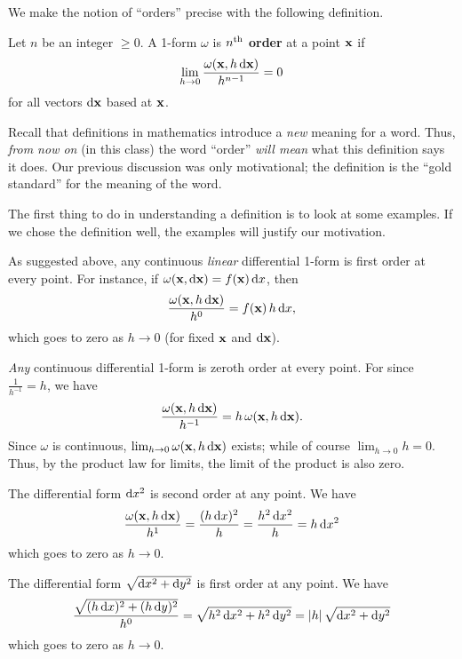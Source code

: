 \documentclass[12pt]{amsart}
\begin{document}
We make the notion of ``orders'' precise with the following definition.

\begin{defn}
  Let $n$ be an integer $\ge 0$.
  A 1-form $\omega$ is \textbf{$n^{\mathrm{th}}$ order} at a point $\mathbf{x}$ if
  \[ \lim_{h\to 0} \frac{\omega(\mathbf{x},h\,\mathrm{d}\mathbf{x})}{h^{n-1}} = 0 \]
  for all vectors $\mathrm{d} \mathbf{x}$ based at $\mathbf{x}$.
\end{defn}

Recall that definitions in mathematics introduce a \emph{new} meaning for a word.
Thus, \emph{from now on} (in this class) the word ``order'' \emph{will mean} what this definition says it does.
Our previous discussion was only motivational; the definition is the ``gold standard'' for the meaning of the word.

The first thing to do in understanding a definition is to look at some examples.
If we chose the definition well, the examples will justify our motivation.

\begin{eg}
  As suggested above, any continuous \emph{linear} differential 1-form is first order at every point.
  For instance, if $\omega(\mathbf{x},\mathrm{d}\mathbf{x}) = f(\mathbf{x}) \, \mathrm{d} x$, then
  \[ \frac{\omega(\mathbf{x},h\,\mathrm{d}\mathbf{x})}{h^0} = f(\mathbf{x}) \, h\, \mathrm{d} x,\]
  which goes to zero as $h\to 0$ (for fixed $\mathbf{x}$ and $\mathrm{d}\mathbf{x}$).
\end{eg}

\begin{eg}
  \emph{Any} continuous differential 1-form is zeroth order at every point.
  For since $\frac{1}{h^{-1}} = h$, we have
  \[\frac{\omega(\mathbf{x},h\,\mathrm{d} \mathbf{x})}{h^{-1}} = h \,\omega(\mathbf{x},h\,\mathrm{d} \mathbf{x}).\]
  Since $\omega$ is continuous, $\lim_{h\to 0} \omega(\mathbf{x},h\,\mathrm{d} \mathbf{x})$ exists; while of course $\lim_{h\to 0} h = 0$.
  Thus, by the product law for limits, the limit of the product is also zero.
\end{eg}

\begin{eg}
  The differential form $\mathrm{d} x^2$ is second order at any point.
  We have
  \[ \frac{\omega(\mathbf{x},h\,\mathrm{d}\mathbf{x})}{h^1} = \frac{(h\,\mathrm{d} x)^2}{h} = \frac{h^2 \, \mathrm{d} x^2}{h} = h \,\mathrm{d} x^2 \]
  which goes to zero as $h\to 0$.
\end{eg}

\begin{eg}
  The differential form $\sqrt{\mathrm{d} x^2+\mathrm{d} y^2}$ is first order at any point.
  We have
  \[ \frac{\sqrt{(h\,\mathrm{d} x)^2+(h\,\mathrm{d} y)^2}}{h^0} =
  \sqrt{h^2\,\mathrm{d} x^2+h^2\,\mathrm{d} y^2} = |h| \, \sqrt{\mathrm{d} x^2+\mathrm{d} y^2}
  \]
  which goes to zero as $h\to 0$.
\end{eg}
\end{document}
